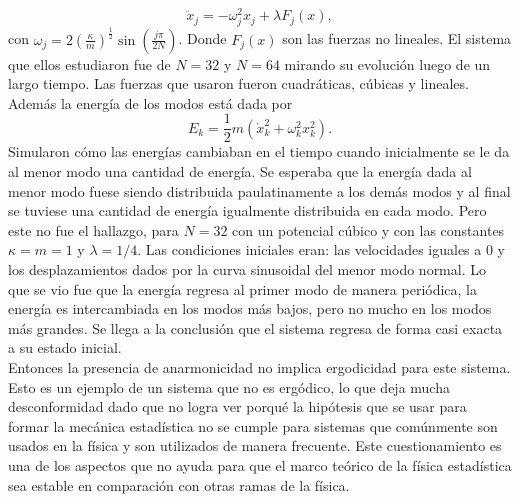 \begin{equation}
\ddot{x}_{j}= - \omega_{j}^{2} x_{j} +\lambda F_{j}(x),
\end{equation}
con $\omega_{j} =2(\frac{\kappa }{m})^{\frac{1}{2}} \sin (\frac{j \pi}{2N})$. Donde $F_{j}(x)$ son las fuerzas no lineales. El sistema que ellos estudiaron fue de $N=32$  y $N=64$ mirando su evolución luego de un largo tiempo. Las fuerzas que usaron fueron cuadráticas, cúbicas y lineales. Además la energía de los modos está dada por 
\begin{equation}
E_{k} = \frac{1}{2} m(\dot{x}^{2}_{k}+ \omega_{k}^{2}x_{k}^{2}).
\end{equation}
Simularon cómo las energías cambiaban en el tiempo cuando inicialmente se le da al menor modo una cantidad de energía. Se esperaba que la energía dada al menor modo fuese siendo distribuida paulatinamente a los demás modos y al final se tuviese una cantidad de energía igualmente distribuida en cada modo. Pero este no fue el hallazgo, para $N=32$ con un potencial cúbico y con las constantes $\kappa=m=1$ y $\lambda=1/4$. Las condiciones iniciales eran: las velocidades iguales a 0 y los desplazamientos dados por la curva sinusoidal del menor modo normal. Lo que se vio fue que la energía regresa al primer modo de manera periódica, la energía es intercambiada en los modos más bajos, pero no mucho en los modos más grandes. Se llega a la conclusión que el sistema regresa de forma casi exacta a su estado inicial.  \\
Entonces la presencia de anarmonicidad no implica ergodicidad para este sistema. Esto es un ejemplo de un sistema que no es ergódico, lo que deja mucha desconformidad dado que no logra  ver porqué la hipótesis que se usar para formar la mecánica estadística no se cumple para sistemas que comúnmente  son usados en la física y son utilizados de manera frecuente. Este cuestionamiento es una de los aspectos que no ayuda para que el marco teórico de la física estadística  sea   estable en comparación con otras ramas de la física.


